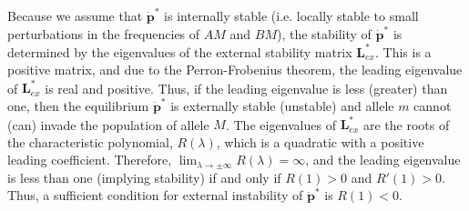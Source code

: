 \documentclass[12pt]{extarticle}
\let\vec\mathbf
\newcommand{\cl}{\mathbf{L}}
\begin{document}
\begin{appendices}
Because we assume that $\vec{\dot{p}^*}$ is internally stable (i.e. locally stable to small perturbations in the frequencies of $AM$ and $BM$), the stability of 
$\vec{\dot{p}^*}$ is determined by the eigenvalues of the external stability matrix $\cl^*_{ex}$.
This is a positive matrix, and due to the Perron-Frobenius theorem, the leading eigenvalue of $\cl^*_{ex}$ is real and positive.
Thus, if the leading eigenvalue is less (greater) than one, then the equilibrium $\vec{\dot{p}^*}$ is externally stable (unstable) and allele $m$ cannot (can) invade the population of allele $M$. 
The eigenvalues of $\cl^*_{ex}$ are the roots of the characteristic polynomial, $R(\lambda)$,
which is a quadratic with a positive leading coefficient. Therefore, $\lim_{\lambda \to \pm \infty} R(\lambda) = \infty$, and the leading eigenvalue is less than one (implying stability) if and only if $R(1)>0$ and $R'(1)>0$.
Thus, a sufficient condition for external instability of $\vec{\dot{p}^*}$ is $R(1) < 0$.


\end{appendices}
\end{document}
